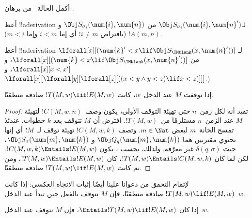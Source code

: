 \documentclass[../../../include/open-logic-section]{subfiles}
\begin{document}
\begin{prob}
أكمل الحالة~ من برهان
.
\end{prob}

\begin{prob}
أعط !!a{derivation} لـ$\Obj S_{\sigma_i}(\num{i},\num{n}')$ من
$\Obj S_{\sigma_i}(\num{i},\num{n})$ و$!A(m,n)$ (بافتراض
$i\neq m$؛ أي إما $i<m$ وإما $m<i$).
\end{prob}

\begin{prob}
أعط !!a{derivation} لـ
$\lforall[x][(\num{k}'<x\lif\Obj S_\TMblank(x,\num{n}'))]$ من
$\lforall[x][(\num{k}<x\lif\Obj S_\TMblank(x,\num{n}'))]$، و
$\lforall[x][x<x']$، و
$\lforall[x][\lforall[y][\lforall[z][((x<y\land y<z)\lif x<z)]]]$.)
\end{prob}


\begin{lem}
إذا توقفت $M$ عند الدخل~$w$، كانت $!T(M,w)\lif !E(M,w)$ صادقة
منطقيًا.
\end{lem}

\begin{proof}
تفيد  أنه لكل زمن~$n$ حتى تهيئة التوقف الأولى، يكون
وصف~$!C(M,w,n)$ لتهيئة $M$ عند الزمن~$n$ مستلزمًا من~$!T(M,w)$.
افترض أن $M$ تتوقف بعد $k$ خطوات. عندئذ تمسح الخانة~$m$ لبعض
$m\in\Nat$. وتصف $!C(M,w,k)$ تهيئة توقف لـ~$M$؛ أي إنها تحتوي
مقترنين هما $\Obj Q_q(\num{m},\num{k})$ و
$\Obj S_\sigma(\num{m},\num{k})$، حيث
$\delta(q,\sigma)$ غير معرّفة. ولذلك، بحسب
، يكون
$!C(M,w,k)\Entails !E(M,w)$. لكن لما كان
$!T(M,w)\Entails !C(M,w,k)$، كان $!T(M,w)\Entails !E(M,w)$، ومن ثم
كانت $!T(M,w)\lif !E(M,w)$ صادقة منطقيًا.
\end{proof}


\begin{explain}
لإتمام التحقق من دعوانا علينا أيضًا إثبات الاتجاه العكسي: إذا كانت
$!T(M,w)\lif !E(M,w)$ صادقة منطقيًا، فإن $M$ تتوقف بالفعل حين تبدأ
عند الدخل~$w$.
\end{explain}

\begin{lem}
إذا كان $\Entails !T(M,w)\lif !E(M,w)$، فإن $M$ تتوقف عند
الدخل~$w$.
\end{lem}
\end{document}
